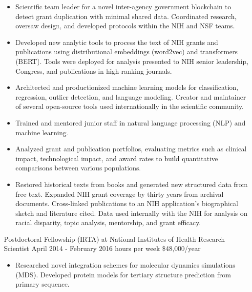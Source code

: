 \documentclass[]{scrartcl}
\begin{document}
\begin{cleanCV}
{\begin{itemize}
    \item Scientific team leader for a novel inter-agency government blockchain to detect grant duplication with minimal shared data. Coordinated research, oversaw design, and developed protocols within the NIH and NSF teams.

    \item Developed new analytic tools to process the text of NIH grants and publications using distributional embeddings (word2vec) and transformers (BERT). Tools were deployed for analysis presented to NIH senior leadership, Congress, and publications in high-ranking journals.

    \item Architected and productionized machine learning models for classification, regression, outlier detection, and language modeling. Creator and maintainer of several open-source tools used internationally in the scientific community.

      \item Trained and mentored junior staff in natural language processing (NLP) and machine learning.
  
  \item Analyzed grant and publication portfolios, evaluating metrics such as clinical impact, technological impact, and award rates to build quantitative comparisons between various populations.
    
  \item Restored historical texts from books and generated new structured data from free text. Expanded NIH grant coverage by thirty years from archival documents. Cross-linked publications to an NIH application's biographical sketch and literature cited. Data used internally with the NIH for analysis on racial disparity, topic analysis, mentorship, and grant efficacy.    
    
  \end{itemize}
}

\vspace{0.5em}
 
\WorkExperience
{}
{Postdoctoral Fellowship (IRTA) at National Institutes of Health}
{\newline Research Scientist}
{
  \newline April 2014 - February 2016
   hours per week
  \newline \$48,000/year
}
{
  \begin{itemize}
  \item Researched novel integration schemes for molecular dynamics simulations (MDS). Developed protein models for tertiary structure prediction from primary sequence.


\end{itemize}}
\end{cleanCV}
\end{document}
